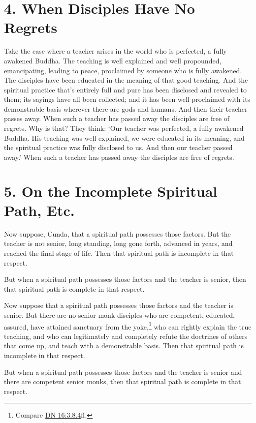 \documentclass[12pt,openany]{book}%
\begin{document}
\section*{4. When Disciples Have No Regrets }

Take the case where a teacher arises in the world who is perfected, a fully awakened Buddha. The teaching is well explained and well propounded, emancipating, leading to peace, proclaimed by someone who is fully awakened. The disciples have been educated in the meaning of that good teaching. And the spiritual practice that’s entirely full and pure has been disclosed and revealed to them; its sayings have all been collected; and it has been well proclaimed with its demonstrable basis wherever there are gods and humans. And then their teacher passes away. When such a teacher has passed away the disciples are free of regrets. Why is that? They think: ‘Our teacher was perfected, a fully awakened Buddha. His teaching was well explained, we were educated in its meaning, and the spiritual practice was fully disclosed to us. And then our teacher passed away.’ When such a teacher has passed away the disciples are free of regrets. 

\section*{5. On the Incomplete Spiritual Path, Etc. }

Now suppose, Cunda, that a spiritual path possesses those factors. But the teacher is not senior, long standing, long gone forth, advanced in years, and reached the final stage of life. Then that spiritual path is incomplete in that respect. 

But when a spiritual path possesses those factors and the teacher is senior, then that spiritual path is complete in that respect. 

Now suppose that a spiritual path possesses those factors and the teacher is senior. But there are no senior monk disciples who are competent, educated, assured, have attained sanctuary from the yoke,\footnote{Compare \href{https://suttacentral.net/dn16/en/sujato\#3.8.4}{DN 16:3.8.4}ff. } who can rightly explain the true teaching, and who can legitimately and completely refute the doctrines of others that come up, and teach with a demonstrable basis. Then that spiritual path is incomplete in that respect. 

But when a spiritual path possesses those factors and the teacher is senior and there are competent senior monks, then that spiritual path is complete in that respect. 
\end{document}
